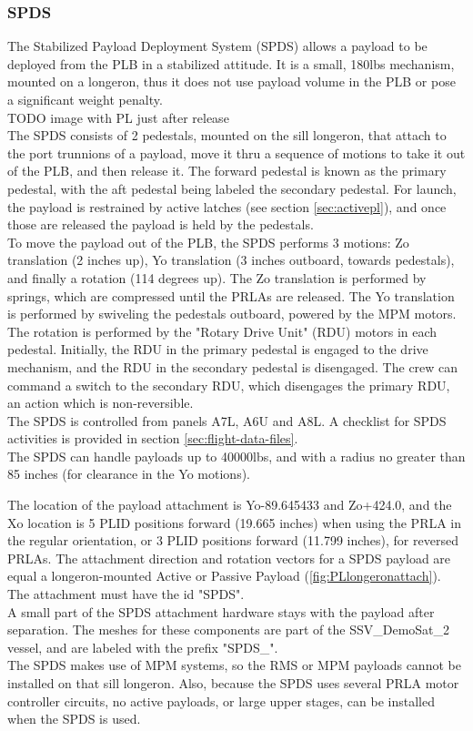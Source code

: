 \documentclass[Space_Shuttle_Vessel_Manual.tex]{subfiles}
\begin{document}
\begin{multicols*}{2}
\subsubsection{SPDS}
The Stabilized Payload Deployment System (SPDS) allows a payload to be deployed from the PLB in a stabilized attitude. It is a small, 180lbs mechanism, mounted on a longeron, thus it does not use payload volume in the PLB or pose a significant weight penalty.
\\
TODO image with PL just after release
\\
The SPDS consists of 2 pedestals, mounted on the sill longeron, that attach to the port trunnions of a payload, move it thru a sequence of motions to take it out of the PLB, and then release it. The forward pedestal is known as the primary pedestal, with the aft pedestal being labeled the secondary pedestal. For launch, the payload is restrained by active latches (see section \ref{sec:activepl}), and once those are released the payload is held by the pedestals.
\\
To move the payload out of the PLB, the SPDS performs 3 motions: Zo translation (2 inches up), Yo translation (3 inches outboard, towards pedestals), and finally a rotation (114 degrees up). The Zo translation is performed by springs, which are compressed until the PRLAs are released. The Yo translation is performed by swiveling the pedestals outboard, powered by the MPM motors. The rotation is performed by the "Rotary Drive Unit" (RDU) motors in each pedestal. Initially, the RDU in the primary pedestal is engaged to the drive mechanism, and the RDU in the secondary pedestal is disengaged. The crew can command a switch to the secondary RDU, which disengages the primary RDU, an action which is non-reversible.
\\
The SPDS is controlled from panels A7L, A6U and A8L. A checklist for SPDS activities is provided in section \ref{sec:flight-data-files}.
\\
The SPDS can handle payloads up to 40000lbs, and with a radius no greater than 85 inches (for clearance in the Yo motions). 

The location of the payload attachment is Yo-89.645433 and Zo+424.0, and the Xo location is 5 PLID positions forward (19.665 inches) when using the PRLA in the regular orientation, or 3 PLID positions forward (11.799 inches), for reversed PRLAs. The attachment direction and rotation vectors for a SPDS payload are equal a longeron-mounted Active or Passive Payload (\ref{fig:PLlongeronattach}). The attachment must have the id "SPDS".
\\
A small part of the SPDS attachment hardware stays with the payload after separation. The meshes for these components are part of the SSV\_DemoSat\_2 vessel, and are labeled with the prefix "SPDS\_".
\\
The SPDS makes use of MPM systems, so the RMS or MPM payloads cannot be installed on that sill longeron. Also, because the SPDS uses several PRLA motor controller circuits, no active payloads, or large upper stages, can be installed when the SPDS is used.



\end{multicols*}
\end{document}
